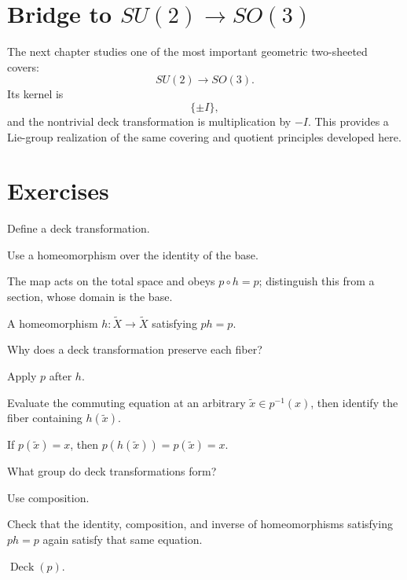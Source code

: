 \section{Bridge to \(SU(2)\to SO(3)\)}

The next chapter studies one of the most important geometric two-sheeted
covers:
\[
SU(2)\to SO(3).
\]
Its kernel is
\[
\{\pm I\},
\]
and the nontrivial deck transformation is multiplication by \(-I\).  This
provides a Lie-group realization of the same covering and quotient principles
developed here.


\section{Exercises}

\begin{exercise}\label{exr:viii12-01}
Define a deck transformation.
\end{exercise}
\begin{hint}
Use a homeomorphism over the identity of the base.

The map acts on the total space and obeys \(p\circ h=p\); distinguish this from a section, whose domain is the base.
\end{hint}
\begin{solution}
A homeomorphism \(h:\widetilde X\to\widetilde X\) satisfying \(ph=p\).
\end{solution}

\begin{exercise}\label{exr:viii12-02}
Why does a deck transformation preserve each fiber?
\end{exercise}
\begin{hint}
Apply \(p\) after \(h\).

Evaluate the commuting equation at an arbitrary \(\tilde x\in p^{-1}(x)\), then identify the fiber containing \(h(\tilde x)\).
\end{hint}
\begin{solution}
If \(p(\tilde x)=x\), then \(p(h(\tilde x))=p(\tilde x)=x\).
\end{solution}

\begin{exercise}\label{exr:viii12-03}
What group do deck transformations form?
\end{exercise}
\begin{hint}
Use composition.

Check that the identity, composition, and inverse of homeomorphisms satisfying \(ph=p\) again satisfy that same equation.
\end{hint}
\begin{solution}
\(\operatorname{Deck}(p)\).
\end{solution}

